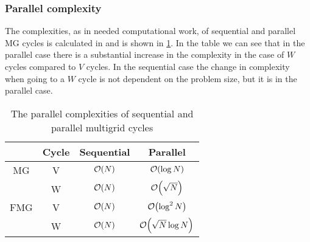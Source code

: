 		\subsubsection{Parallel complexity}
			The complexities, as in needed computational work, of sequential and
			parallel MG cycles is calculated in \cite{hackbusch_multigrid_1982} and is
			shown in \cref{tab:parallel_complexity}. In the table we can see that in
			the parallel case there is a substantial increase in the complexity in the
			case of \(W\) cycles compared to \(V\) cycles. In the sequential case the
			change in complexity when going to a \(W\) cycle is not dependent on the
			problem size, but it is in the parallel case.


		\begin{table}
			\centering
			\begin{tabular}{ c  c c c}
				& Cycle & Sequential & Parallel
			  	\\  \hline
			  	MG & V & \(\order{N}\) & \(\order{\log N}\)
			  	\\
			  	& W & $\order{N}$ & $\order{\sqrt{N}}$
			  	\\ \hline
				FMG & V & $\order{N}$ & $\order{\log^2 N}$
				\\
				& W & $\order{N}$ & \( \order{\sqrt{N} \log{N}} \)
			\end{tabular}
			\caption{The parallel complexities of sequential and parallel multigrid cycles}
			\label{tab:parallel_complexity}
		\end{table}
